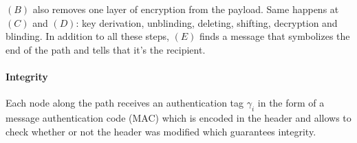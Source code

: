 $(B)$ also removes one layer of encryption from the payload.
Same happens at $(C)$ and $(D)$: key derivation, unblinding, deleting, shifting, decryption and blinding. 
In addition to all these steps, $(E)$ finds a message that symbolizes the end of the path and tells that it’s the recipient.

\paragraph{Integrity}
Each node along the path receives an authentication tag $\gamma_i$ in the form of a message authentication code (MAC)
 which is encoded in the header and allows to check whether or not the header was modified which guarantees integrity.










